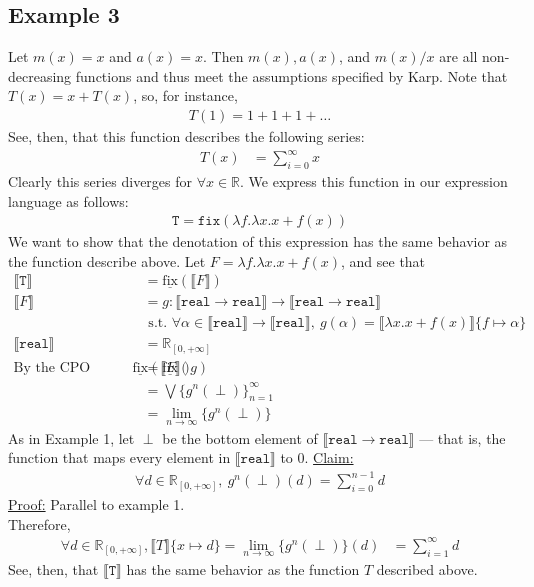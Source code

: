 \documentclass{westhesis}
\newcommand{\R}{\mathbb{R}}
\begin{document}
 \subsection{Example 3} Let $m(x) = x$ and $a(x) = x$. Then $m(x), a(x)$, and $m(x)/x$ are all non-decreasing functions and thus meet the assumptions specified by Karp. Note that $T(x) = x + T(x)$, so, for instance,
\begin{align*}
T(1) = 1 + 1 + 1 + \ldots
\end{align*}
See, then, that this function describes the following series:
\begin{align*}
T(x) &= \sum_{i=0}^{\infty} x 
\end{align*}
Clearly this series diverges for $\forall x \in \R$. We express this function in our expression language as follows:
\begin{align*}
 \texttt{T} = \texttt{fix}(\lambda f. \lambda x.x + f(x))
 \end{align*}
 We want to show that the denotation of this expression has the same behavior as the function describe above. Let $F = \lambda f. \lambda x.x + f (x)$, and see that 
 \begin{align*}
 \llbracket \texttt{T} \rrbracket &= \underline{\text{fix}}(\llbracket F \rrbracket) \\
 \llbracket F \rrbracket &= g : \llbracket \texttt{real} \rightarrow \texttt{real}\rrbracket \rightarrow \llbracket \texttt{real} \rightarrow \texttt{real}\rrbracket \\ &\text{ \ \ \ s.t. } \forall \alpha \in \llbracket \texttt{real}\rrbracket \rightarrow \llbracket \texttt{real}\rrbracket, \ 
 g(\alpha) = \llbracket \lambda x.x + f (x)\rrbracket\{f \mapsto \alpha\} \\
 \llbracket \texttt{real}\rrbracket &= \R_{[0, +\infty]}  
 \\\text{By the CPO fixpoint theorem, } \underline{\text{fix}}(\llbracket F \rrbracket) &= \underline{\text{fix}}(g) \\
&= \bigvee\{g^n (\perp)\}^{\infty}_{n=1} \\
&= \lim_{n \to \infty}\{g^n (\perp)\}
 \end{align*}
As in Example 1, let $\perp$ be the bottom element of $\llbracket \texttt{real} \rightarrow \texttt{real} \rrbracket$ --- that is, 
the function that maps every element in $\llbracket \texttt{real} \rrbracket$ to $0$. 
  \underline{Claim:}
 \begin{align*}
 \forall d \in \R_{[0, +\infty]}, \ g^n(\perp)(d) = \sum_{i = 0}^{n-1}d
 \end{align*}
 \underline{Proof:} Parallel to example 1. \\
Therefore, 
 \begin{align*}
 \forall d \in \R_{[0,+\infty]}, \llbracket T \rrbracket\{x \mapsto d \} =  \lim_{n \to \infty}\{g^n (\perp)\}(d) &= \sum_{i=1}^{\infty} 
 d 
 \end{align*}
 See, then, that $\llbracket \texttt{T} \rrbracket$ has the same behavior as the function $T$ described above.
\end{document}
